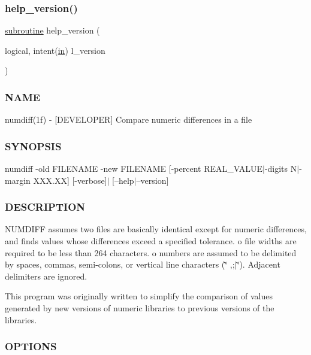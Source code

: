 \subsubsection{\texorpdfstring{help\+\_\+version()}{help\_version()}}
{\footnotesize\ttfamily \hyperlink{M__stopwatch_83_8txt_acfbcff50169d691ff02d4a123ed70482}{subroutine} help\+\_\+version (\begin{DoxyParamCaption}\item[{logical, intent(\hyperlink{M__journal_83_8txt_afce72651d1eed785a2132bee863b2f38}{in})}]{l\+\_\+version }\end{DoxyParamCaption})}



\subsubsection*{N\+A\+ME}

numdiff(1f) -\/ \mbox{[}D\+E\+V\+E\+L\+O\+P\+ER\mbox{]} Compare numeric differences in a file 

\subsubsection*{S\+Y\+N\+O\+P\+S\+IS}

numdiff -\/old F\+I\+L\+E\+N\+A\+ME -\/new F\+I\+L\+E\+N\+A\+ME \mbox{[}-\/percent R\+E\+A\+L\+\_\+\+V\+A\+L\+U\+E$\vert$-\/digits N$\vert$-\/margin X\+X\+X.\+XX\mbox{]} \mbox{[}-\/verbose\mbox{]}$\vert$ \mbox{[}--help$\vert$--version\mbox{]}

\subsubsection*{D\+E\+S\+C\+R\+I\+P\+T\+I\+ON}

N\+U\+M\+D\+I\+FF assumes two files are basically identical except for numeric differences, and finds values whose differences exceed a specified tolerance. o file widths are required to be less than 264 characters. o numbers are assumed to be delimited by spaces, commas, semi-\/colons, or vertical line characters (\char`\"{} ,;$\vert$\char`\"{}). Adjacent delimiters are ignored.

This program was originally written to simplify the comparison of values generated by new versions of numeric libraries to previous versions of the libraries.

\subsubsection*{O\+P\+T\+I\+O\+NS}

